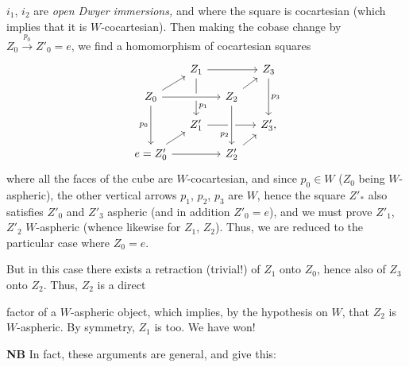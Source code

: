 $i_1$, $i_2$ are \textit{open Dwyer immersions,} and where the square is cocartesian (which implies that it is $W$-cocartesian). Then making the cobase change by $Z_0 \xrightarrow{p_0} Z'_0 = e$, we find a homomorphism of cocartesian squares
\[
\begin{tikzcd}[ampersand replacement=\&, column sep=small, row sep=small]
 \& Z_1 \arrow[rr] \arrow[dd, "p_1" near end] \& \& Z_3 \arrow[dd, "p_3"] \\
Z_0 \arrow[ur] \arrow[rr, crossing over] \arrow[dd, "p_0"'] \& \& Z_2 \arrow[ur] \& \\
 \& Z'_1 \arrow[rr] \& \& Z'_3, \\
e = Z'_0 \arrow[ur] \arrow[rr] \& \& Z'_2 \arrow[ur] \arrow[from=uu, crossing over, "p_2"' near end] \&
\end{tikzcd}
\]
where all the faces of the cube are $W$-cocartesian, and since $p_0 \in W$ ($Z_0$ being $W$-aspheric), the other vertical arrows $p_1$, $p_2$, $p_3$ are $W$, hence the square $Z'_*$ also satisfies $Z'_0$ and $Z'_3$ aspheric (and in addition $Z'_0 = e$), and we must prove $Z'_1$, $Z'_2$ $W$-aspheric (whence likewise for $Z_1$, $Z_2$). Thus, we are reduced to the particular case where $Z_0 = e$.

But in this case there exists a retraction (trivial!) of $Z_1$ onto $Z_0$, hence also of $Z_3$ onto $Z_2$. Thus, $Z_2$ is a direct


factor of a $W$-aspheric object, which implies, by the hypothesis on $W$, that $Z_2$ is $W$-aspheric. By symmetry, $Z_1$ is too. We have won!

\textbf{NB} In fact, these arguments are general, and give this:

